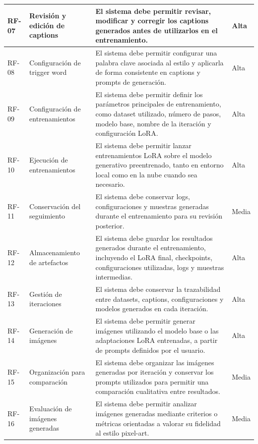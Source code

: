 \documentclass[a4paper,11pt,titlepage]{scrbook}
\begin{document}
\begin{longtable}{|C{1.1cm}|L{3.0cm}|L{7.0cm}|C{1.5cm}|}
RF-07 &
Revisión y edición de captions &
El sistema debe permitir revisar, modificar y corregir los captions generados antes de utilizarlos en el entrenamiento. &
Alta \\
\hline

RF-08 &
Configuración de trigger word &
El sistema debe permitir configurar una palabra clave asociada al estilo y aplicarla de forma consistente en captions y prompts de generación. &
Alta \\
\hline

RF-09 &
Configuración de entrenamientos &
El sistema debe permitir definir los parámetros principales de entrenamiento, como dataset utilizado, número de pasos, modelo base, nombre de la iteración y configuración LoRA. &
Alta \\
\hline

RF-10 &
Ejecución de entrenamientos &
El sistema debe permitir lanzar entrenamientos LoRA sobre el modelo generativo preentrenado, tanto en entorno local como en la nube cuando sea necesario. &
Alta \\
\hline

RF-11 &
Conservación del seguimiento &
El sistema debe conservar logs, configuraciones y muestras generadas durante el entrenamiento para su revisión posterior. &
Media \\
\hline

RF-12 &
Almacenamiento de artefactos &
El sistema debe guardar los resultados generados durante el entrenamiento, incluyendo el LoRA final, checkpoints, configuraciones utilizadas, logs y muestras intermedias. &
Alta \\
\hline

RF-13 &
Gestión de iteraciones &
El sistema debe conservar la trazabilidad entre datasets, captions, configuraciones y modelos generados en cada iteración. &
Alta \\
\hline

RF-14 &
Generación de imágenes &
El sistema debe permitir generar imágenes utilizando el modelo base o las adaptaciones LoRA entrenadas, a partir de prompts definidos por el usuario. &
Alta \\
\hline

RF-15 &
Organización para comparación &
El sistema debe organizar las imágenes generadas por iteración y conservar los prompts utilizados para permitir una comparación cualitativa entre resultados. &
Media \\
\hline
RF-16 & Evaluación de imágenes generadas &
El sistema debe permitir analizar imágenes generadas mediante criterios o métricas orientadas a valorar su fidelidad al estilo pixel-art. &
Media \\
\hline
\end{longtable}
\endgroup
\end{document}

